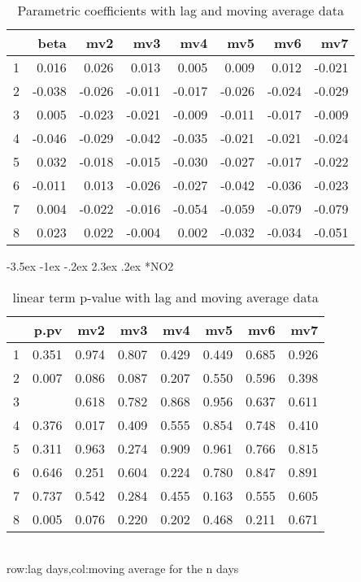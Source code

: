 \documentclass[a4paper, 12pt]{article}
\makeatletter
\def\large{\fontsize{14}{20}\selectfont}
\renewcommand\subsection{\@startsection {subsection}{1}{\z@}%
                                   {-3.5ex \@plus -1ex \@minus -.2ex}%
                                   {2.3ex \@plus.2ex}%
                                   {\centering\normalfont\large\bfseries}}
\makeatother
\begin{document}
\begin{table}[h]
\centering
\caption{Parametric coefficients with lag and moving average data}
\begin{tabular}{rrrrrrrr}
  \hline
 & beta & mv2 & mv3 & mv4 & mv5 & mv6 & mv7 \\
  \hline
1 & 0.016 & 0.026 & 0.013 & 0.005 & 0.009 & 0.012 & -0.021 \\
  2 & -0.038 & -0.026 & -0.011 & -0.017 & -0.026 & -0.024 & -0.029 \\
  3 & 0.005 & -0.023 & -0.021 & -0.009 & -0.011 & -0.017 & -0.009 \\
  4 & -0.046 & -0.029 & -0.042 & -0.035 & -0.021 & -0.021 & -0.024 \\
  5 & 0.032 & -0.018 & -0.015 & -0.030 & -0.027 & -0.017 & -0.022 \\
  6 & -0.011 & 0.013 & -0.026 & -0.027 & -0.042 & -0.036 & -0.023 \\
  7 & 0.004 & -0.022 & -0.016 & -0.054 & -0.059 & -0.079 & -0.079 \\
  8 & 0.023 & 0.022 & -0.004 & 0.002 & -0.032 & -0.034 & -0.051 \\
   \hline
\end{tabular}
\end{table}
\clearpage
\subsection*{NO2}
\begin{table}[h]
\centering
\caption{linear term p-value with lag and moving average data}
\begin{tabular}{rrrrrrrr}
  \hline
 & p.pv & mv2 & mv3 & mv4 & mv5 & mv6 & mv7 \\
  \hline
1 & 0.351 & 0.974 & 0.807 & 0.429 & 0.449 & 0.685 & 0.926 \\
  2 & 0.007 & 0.086 & 0.087 & 0.207 & 0.550 & 0.596 & 0.398 \\
  3 & \color{red}{0.003} & 0.618 & 0.782 & 0.868 & 0.956 & 0.637 & 0.611 \\
  4 & 0.376 & 0.017 & 0.409 & 0.555 & 0.854 & 0.748 & 0.410 \\
  5 & 0.311 & 0.963 & 0.274 & 0.909 & 0.961 & 0.766 & 0.815 \\
  6 & 0.646 & 0.251 & 0.604 & 0.224 & 0.780 & 0.847 & 0.891 \\
  7 & 0.737 & 0.542 & 0.284 & 0.455 & 0.163 & 0.555 & 0.605 \\
  8 & 0.005 & 0.076 & 0.220 & 0.202 & 0.468 & 0.211 & 0.671 \\
   \hline
\end{tabular}
\\row:lag days,col:moving average for the n days
\end{table}
\end{document}
